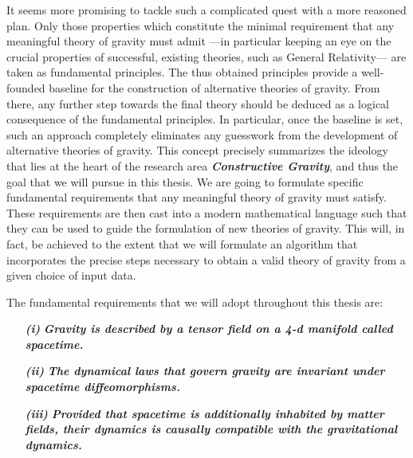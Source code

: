 It seems more promising to tackle such a complicated quest with a more reasoned plan. Only those properties which constitute the minimal requirement that any meaningful theory of gravity must admit ---in particular keeping an eye on the crucial properties of successful, existing theories, such as General Relativity--- are taken as fundamental principles. The thus obtained principles  provide a well-founded baseline for the construction of alternative theories of gravity. From there, any further step towards the final theory should be deduced as a logical consequence of the fundamental principles. In particular, once the baseline is set, such an approach completely eliminates any guesswork from the development of alternative theories of gravity. 
This concept precisely summarizes the ideology that lies at the heart of the research area \textit{\textbf{Constructive Gravity}}, and thus the goal that we will pursue in this thesis.
We are going to formulate specific fundamental requirements that any meaningful theory of gravity must satisfy. These requirements are then cast into a modern mathematical language such that they can be used to guide the formulation of new theories of gravity. This will, in fact, be achieved to the extent that we will formulate an algorithm that incorporates the precise steps necessary to obtain a valid theory of gravity from a given choice of input data. 

The fundamental requirements that we will adopt throughout this thesis are:
\begin{itemize}
    \item[\textbf{\textit{(i)}}] \textbf{\textit{Gravity is described by a tensor field on a 4-d manifold called spacetime.}}
    \item[\textbf{\textit{(ii)}}] \textbf{\textit{The dynamical laws that govern gravity are invariant under spacetime diffeomorphisms.}}
    \item[\textbf{\textit{(iii)}}] \textbf{\textit{Provided that spacetime is additionally inhabited by matter fields, their dynamics is causally compatible with the gravitational dynamics.}}
\end{itemize}

